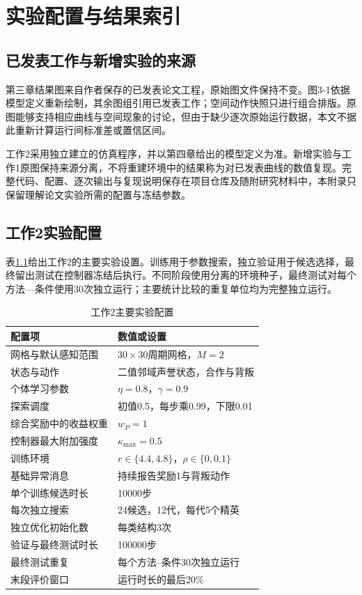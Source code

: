 \chapter{实验配置与结果索引}
\label{app:experiments}

\section{已发表工作与新增实验的来源}

第三章结果图来自作者保存的已发表论文工程，原始图文件保持不变。图3-1依据模型定义重新绘制，其余图组引用已发表工作；空间动作快照只进行组合排版。原图能够支持相应曲线与空间现象的讨论，但由于缺少逐次原始运行数据，本文不据此重新计算运行间标准差或置信区间。

工作2采用独立建立的仿真程序，并以第四章给出的模型定义为准。新增实验与工作1原图保持来源分离，不将重建环境中的结果称为对已发表曲线的数值复现。完整代码、配置、逐次输出与复现说明保存在项目仓库及随附研究材料中，本附录只保留理解论文实验所需的配置与冻结参数。

\section{工作2实验配置}

表\ref{tab:app-development}给出工作2的主要实验设置。训练用于参数搜索，独立验证用于候选选择，最终留出测试在控制器冻结后执行。不同阶段使用分离的环境种子，最终测试对每个方法—条件使用30次独立运行；主要统计比较的重复单位均为完整独立运行。

\begin{table}[!htbp]
\centering
\caption{工作2主要实验配置}
\label{tab:app-development}
\begin{tabular}{ll}
\toprule
配置项 & 数值或设置 \\
\midrule
网格与默认感知范围 & $30\times30$周期网格，$M=2$ \\
状态与动作 & 二值邻域声誉状态，合作与背叛 \\
个体学习参数 & $\eta=0.8$，$\gamma=0.9$ \\
探索调度 & 初值0.5，每步乘0.99，下限0.01 \\
综合奖励中的收益权重 & $w_P=1$ \\
控制器最大附加强度 & $\kappa_{\max}=0.5$ \\
训练环境 & $r\in\{4.4,4.8\}$，$\rho\in\{0,0.1\}$ \\
基础异常消息 & 持续报告奖励1与背叛动作 \\
单个训练候选时长 & 10000步 \\
每次独立搜索 & 24候选，12代，每代5个精英 \\
独立优化初始化数 & 每类结构3次 \\
验证与最终测试时长 & 100000步 \\
最终测试重复 & 每个方法--条件30次独立运行 \\
末段评价窗口 & 运行时长的最后20\% \\
\bottomrule
\end{tabular}
\par{}
\end{table}

